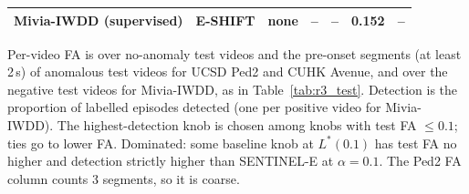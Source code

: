 \begin{table}[p]
{\begin{tabular}{llllllc}
Mivia-IWDD (supervised) & E-SHIFT & none & -- & -- & 0.152 & -- \\
\bottomrule
\end{tabular}}
\begin{minipage}{\linewidth}\vspace{2pt}\footnotesize Per-video FA is over no-anomaly test videos and the pre-onset segments (at least 2\,s) of anomalous test videos for UCSD Ped2 and CUHK Avenue, and over the negative test videos for Mivia-IWDD, as in Table~\ref{tab:r3_test}. Detection is the proportion of labelled episodes detected (one per positive video for Mivia-IWDD). The highest-detection knob is chosen among knobs with test FA $\le 0.1$; ties go to lower FA. Dominated: some baseline knob at $L^\ast(0.1)$ has test FA no higher and detection strictly higher than SENTINEL-E at $\alpha=0.1$. The Ped2 FA column counts 3 segments, so it is coarse.\end{minipage}
\end{table}

